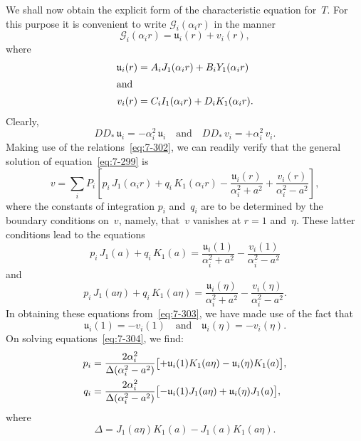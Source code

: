 We shall now obtain the explicit form of the characteristic equation
for~$T$.  For this purpose it is convenient to write $\mathscr{G}_i(\alpha_i r)$ in the manner
\begin{equation}
\label{eq:7-300}
\mathscr{G}_i(\alpha_i r) = \mathfrak{u}_i(r) + v_i(r),
\end{equation}
where
\begin{align}
\label{eq:7-301}
\mathfrak{u}_i(r) &= A_i J_1(\alpha_i r) + B_i Y_1(\alpha_i r) \notag\\
\intertext{and}
v_i(r) &= C_i I_1(\alpha_i r) + D_i K_1(\alpha_i r).
\end{align}
Clearly,
\begin{equation}
\label{eq:7-302}
DD_*\,\mathfrak{u}_i = -\alpha_i^2\,\mathfrak{u}_i
\quad\text{and}\quad
DD_*\,v_i = +\alpha_i^2\,v_i.
\end{equation}
Making use of the relations~\eqref{eq:7-302}, we can readily verify that the general
solution of equation~\eqref{eq:7-299} is
\begin{equation}
\label{eq:7-303}
v = \sum_i P_i\!\left[
  p_i\,J_1(\alpha_i r) + q_i\,K_1(\alpha_i r)
  - \frac{\mathfrak{u}_i(r)}{\alpha_i^2+a^2}
  + \frac{v_i(r)}{\alpha_i^2-a^2}
\right],
\end{equation}
where the constants of integration $p_i$ and~$q_i$ are to be determined by
the boundary conditions on~$v$, namely, that~$v$ vanishes at $r = 1$ and~$\eta$.  These
latter conditions lead to the equations
\begin{equation}
\label{eq:7-304}
p_i\,J_1(a) + q_i\,K_1(a)
  = \frac{\mathfrak{u}_i(1)}{\alpha_i^2+a^2}
  - \frac{v_i(1)}{\alpha_i^2-a^2}
\end{equation}
and
\begin{equation}
p_i\,J_1(a\eta) + q_i\,K_1(a\eta)
  = \frac{\mathfrak{u}_i(\eta)}{\alpha_i^2+a^2}
  - \frac{v_i(\eta)}{\alpha_i^2-a^2}.
\end{equation}
In obtaining these equations from~\eqref{eq:7-303}, we have made use of the fact
that
\begin{equation}
\label{eq:7-305}
\mathfrak{u}_i(1) = -v_i(1) \quad\text{and}\quad
\mathfrak{u}_i(\eta) = -v_i(\eta).
\end{equation}
On solving equations~\eqref{eq:7-304}, we find:
\begin{align}
\label{eq:7-306}
p_i &= \frac{2\alpha_i^2}{\Delta(\alpha_i^2-a^2)}\bigl[
  +\mathfrak{u}_i(1)K_1(a\eta) - \mathfrak{u}_i(\eta)K_1(a)\bigr], \notag\\
q_i &= \frac{2\alpha_i^2}{\Delta(\alpha_i^2-a^2)}\bigl[
  -\mathfrak{u}_i(1)J_1(a\eta) + \mathfrak{u}_i(\eta)J_1(a)\bigr],
\end{align}
where
\begin{equation}
\label{eq:7-307}
\Delta = J_1(a\eta)K_1(a) - J_1(a)K_1(a\eta).
\end{equation}

